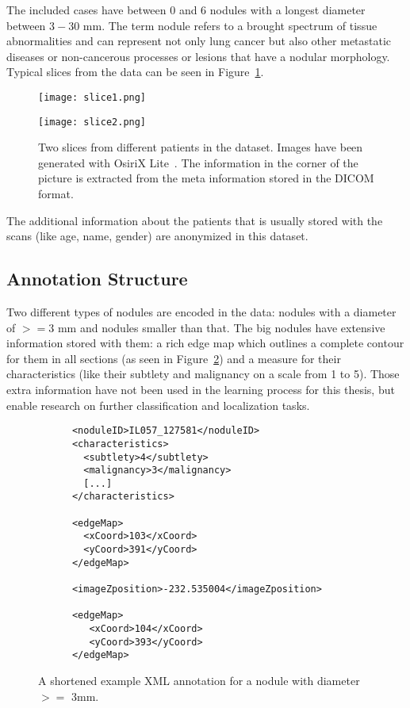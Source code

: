 \documentclass[../Thesis.tex]{subfiles}
\begin{document}
The included cases have between 0 and 6 nodules with a longest diameter between $3-30$ mm. The term nodule refers to a brought spectrum of tissue abnormalities and can represent not only lung cancer but also other metastatic diseases or non-cancerous processes or lesions that have a nodular morphology. Typical slices from the data can be seen in Figure~\ref{fig:slices}.

\begin{figure}[!tbp]
\centering
\begin{minipage}[b]{0.7\textwidth}
	\texttt{[image: slice1.png]}
\end{minipage}
\begin{minipage}[b]{0.7\textwidth}
	\texttt{[image: slice2.png]}
\end{minipage}
\caption{Two slices from different patients in the dataset. Images have been generated with OsiriX Lite~\cite{rosset2004osirix}. The information in the corner of the picture is extracted from the meta information stored in the DICOM format.}
\label{fig:slices}
\end{figure}

The additional information about the patients that is usually stored with the scans (like age, name, gender) are anonymized in this dataset.

\subsection{Annotation Structure}
Two different types of nodules are encoded in the data: nodules with a diameter of $>=3$ mm and nodules smaller than that. The big nodules have extensive information stored with them: a rich edge map which outlines a complete contour for them in all sections (as seen in Figure~\ref{fig:bigNod}) and a measure for their characteristics (like their subtlety and malignancy on a scale from 1 to 5). Those extra information have not been used in the learning process for this thesis, but enable research on further classification and localization tasks.

\begin{figure}
\begin{lstlisting}
      <noduleID>IL057_127581</noduleID>
      <characteristics>
        <subtlety>4</subtlety>
        <malignancy>3</malignancy>
        [...]
      </characteristics>
      
      <edgeMap>
        <xCoord>103</xCoord>
        <yCoord>391</yCoord>
      </edgeMap>
 
      <imageZposition>-232.535004</imageZposition>
       
      <edgeMap>
         <xCoord>104</xCoord>
         <yCoord>393</yCoord>
      </edgeMap>
\end{lstlisting}
\caption{A shortened example XML annotation for a nodule with diameter $>=$ 3mm.}
\label{fig:bigNod}
\end{figure}
\end{document}
